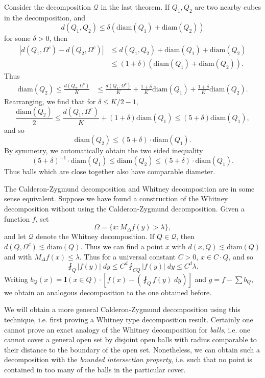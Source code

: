 \begin{remark}
    Consider the decomposition $\mathcal{Q}$ in the last theorem. If $Q_1,Q_2$ are two nearby cubes in the decomposition, and
    \[ d(Q_1,Q_2) \leq \delta ( \text{diam}(Q_1) + \text{diam}(Q_2)) \]
    for some $\delta > 0$, then
    \begin{align*}
        | d(Q_1,\Omega^c) - d(Q_2,\Omega^c) | &\leq d(Q_1,Q_2) + \text{diam}(Q_1) + \text{diam}(Q_2)\\
        &\leq (1 + \delta) (\text{diam}(Q_1) + \text{diam}(Q_2)).
    \end{align*}
    Thus
    \begin{align*}
        \text{diam}(Q_2) \leq \frac{d(Q_2,\Omega^c)}{K} &\leq \frac{d(Q_1,\Omega^c)}{K} + \frac{1 + \delta}{K} \text{diam}(Q_1) + \frac{1 + \delta}{K} \text{diam}(Q_2).
    \end{align*}
    Rearranging, we find that for $\delta \leq K/2 - 1$,
    \[ \frac{\text{diam}(Q_2)}{2} \leq \frac{d(Q_1,\Omega^c)}{K} + (1 + \delta) \text{diam}(Q_1) \leq (5 + \delta) \text{diam}(Q_1), \]
    and so
    \[ \text{diam}(Q_2) \leq (5 + \delta) \cdot \text{diam}(Q_1). \]
    By symmetry, we automatically obtain the two sided inequality
    \[ (5 + \delta)^{-1} \cdot \text{diam}(Q_1) \leq \text{diam}(Q_2) \leq (5 + \delta) \cdot \text{diam}(Q_1). \]
    Thus balls which are close together also have comparable diameter.
\end{remark}

The Calderon-Zygmund decomposition and Whitney decomposition are in some sense equivalent. Suppose we have found a construction of the Whitney decomposition without using the Calderon-Zygmund decomposition. Given a function $f$, set
%
\[ \Omega = \{ x : M_\Delta f(y) > \lambda \}, \]
%
and let $\mathcal{Q}$ denote the Whitney decomposition. If $Q \in \mathcal{Q}$, then $d(Q,\Omega^c) \lesssim \text{diam}(Q)$. Thus we can find a point $x$ with $d(x,Q) \lesssim \text{diam}(Q)$ and with $M_\Delta f(x) \leq \lambda$. Thus for a universal constant $C > 0$, $x \in C \cdot Q$, and so
%
\[ \fint_Q |f(y)|\; dy \leq C^d \fint_{CQ} |f(y)|\; dy \leq C^d \lambda. \]
%
Writing $b_Q(x) = \mathbf{I}(x \in Q) \cdot [f(x) - (\fint_Q f(y)\; dy)]$ and $g = f - \sum b_Q$, we obtain an analogous decomposition to the one obtained before.

We will obtain a more general Calderon-Zygmund decomposition using this technique, i.e. first proving a Whitney type decomposition result. Certainly one cannot prove an exact analogy of the Whitney decomposition for \emph{balls}, i.e. one cannot cover a general open set by disjoint open balls with radius comparable to their distance to the boundary of the open set. Nonetheless, we can obtain such a decomposition with the \emph{bounded intersection property}, i.e. such that no point is contained in too many of the balls in the particular cover.

